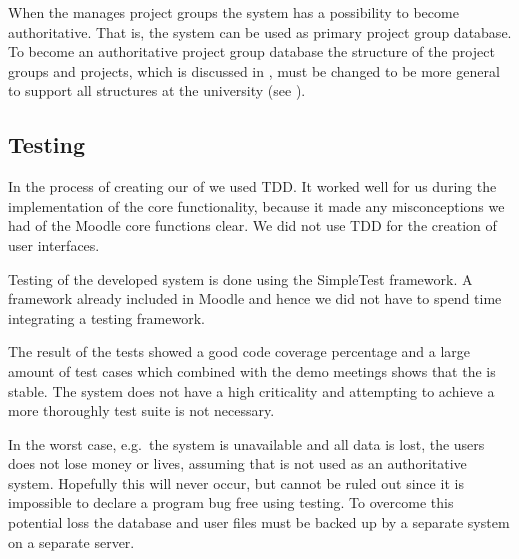 When the \admpers{} manages project groups the system has a possibility to become authoritative.
That is, the system can be used as primary project group database. 
To become an authoritative project group database the structure of the project groups and projects, which is discussed in , must be changed to be more general to support all structures at the university (see ).




\subsection{Testing}
In the process of creating our \subsystem{} of \system{} we used TDD.
It worked well for us during the implementation of the core functionality, because it made any misconceptions we had of the Moodle core functions clear.
We did not use TDD for the creation of user interfaces.

Testing of the developed system is done using the SimpleTest framework. 
A framework already included in Moodle and hence we did not have to spend time integrating a testing framework.

The result of the tests showed a good code coverage percentage and a large amount of test cases which combined with the demo meetings shows that the \subsystem{} is stable. 
The system does not have a high criticality and attempting to achieve a more thoroughly test suite is not necessary. 

In the worst case, e.g.\ the system is unavailable and all data is lost, the users does not lose money or lives, assuming that \system{} is not used as an authoritative system.
Hopefully this will never occur, but cannot be ruled out since it is impossible to declare a program bug free using testing.
To overcome this potential loss the database and user files must be backed up by a separate system on a separate server.